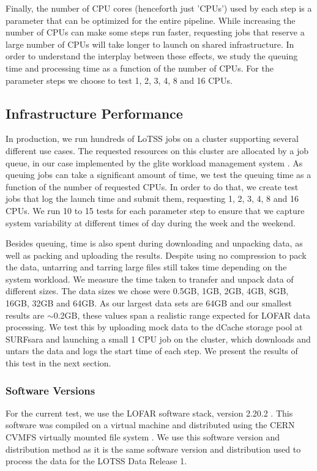 Finally, the number of CPU cores (henceforth just 'CPUs') used by each step is a parameter that can be optimized for the entire pipeline. While increasing the number of CPUs can make some steps run faster, requesting jobs that reserve a large number of CPUs will take longer to launch on shared infrastructure. In order to understand the interplay between these effects, we study the queuing time and processing time as a function of the number of CPUs. For the parameter steps we choose to test 1, 2, 3, 4, 8 and 16 CPUs. 

\subsection{Infrastructure Performance}

In production, we run hundreds of LoTSS jobs on a cluster supporting several different use cases. The requested resources on this cluster are allocated by a job queue, in our case implemented by the glite workload management system \citep{glite-wms}. As queuing jobs can take a significant amount of time, we test the queuing time as a function of the number of requested CPUs. In order to do that, we create test jobs that log the launch time and submit them, requesting 1, 2, 3, 4, 8 and 16 CPUs. We run 10 to 15 tests for each parameter step to ensure that we capture system variability at different times of day during the week and the weekend. 

Besides queuing, time is also spent during downloading and unpacking data, as well as packing and uploading the results. Despite using no compression to pack the data, untarring and tarring large files still takes time depending on the system workload. We measure the time taken to transfer and unpack data of different sizes. The data sizes we chose were 0.5GB, 1GB, 2GB, 4GB, 8GB, 16GB, 32GB and 64GB. As our largest data sets are 64GB and our smallest results are $\sim$0.2GB, these values span a realistic range expected for LOFAR data processing. We test this by uploading mock data to the dCache storage pool at SURFsara and launching a small 1 CPU job on the cluster, which downloads and untars the data and logs the start time of each step. We present the results of this test in the next section. 


\subsubsection{Software Versions}\label{sec:software_versions}
For the current test, we use the LOFAR software stack, version 2.20.2 \citep{cookbook}. This software was compiled on a virtual machine and distributed using the CERN CVMFS virtually mounted file system \citep{cvmfs2008}. We use this software version and distribution method as it is the same software version and distribution used to process the data for the LOTSS Data Release 1. 

